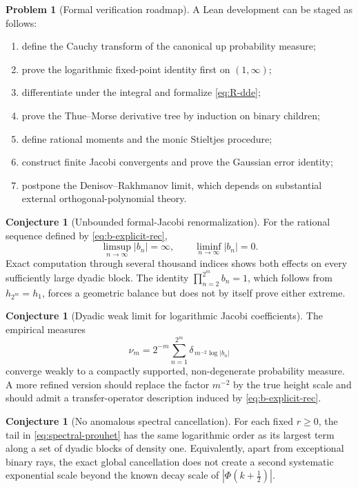 \documentclass[11pt]{article}
\theoremstyle{definition}
\newtheorem{conjecture}[theorem]{Conjecture}
\newtheorem{problem}[theorem]{Problem}
\theoremstyle{remark}
\begin{document}
\begin{problem}[Formal verification roadmap]
A Lean development can be staged as follows:
\begin{enumerate}
\item define the Cauchy transform of the canonical up probability measure;
\item prove the logarithmic fixed-point identity first on \((1,\infty)\);
\item differentiate under the integral and formalize \eqref{eq:R-dde};
\item prove the Thue--Morse derivative tree by induction on binary children;
\item define rational moments and the monic Stieltjes procedure;
\item construct finite Jacobi convergents and prove the Gaussian error identity;
\item postpone the Denisov--Rakhmanov limit, which depends on substantial external
      orthogonal-polynomial theory.
\end{enumerate}
\end{problem}



\begin{conjecture}[Unbounded formal-Jacobi renormalization]
\label{conj:formal-b-unbounded}
For the rational sequence defined by \eqref{eq:b-explicit-rec},
\[
 \limsup_{n\to\infty}|b_n|=\infty,
 \qquad
 \liminf_{n\to\infty}|b_n|=0.
\]
Exact computation through several thousand indices shows both effects on every sufficiently
large dyadic block.  The identity \(\prod_{n=2}^{2^m}b_n=1\), which follows from
\(h_{2^m}=h_1\), forces a geometric balance but does not by itself prove either extreme.
\end{conjecture}

\begin{conjecture}[Dyadic weak limit for logarithmic Jacobi coefficients]
\label{conj:b-log-limit}
The empirical measures
\[
 \nu_m=2^{-m}\sum_{n=1}^{2^m}
 \delta_{\,m^{-2}\log|b_n|}
\]
converge weakly to a compactly supported, non-degenerate probability measure.  A more
refined version should replace the factor \(m^{-2}\) by the true height scale and should
admit a transfer-operator description induced by \eqref{eq:b-explicit-rec}.
\end{conjecture}

\begin{conjecture}[No anomalous spectral cancellation]
\label{conj:no-anomalous-cancellation}
For each fixed \(r\ge0\), the tail in \eqref{eq:spectral-prouhet} has the same logarithmic
order as its largest term along a set of dyadic blocks of density one.  Equivalently, apart
from exceptional binary rays, the exact global cancellation does not create a second
systematic exponential scale beyond the known decay scale of
\(|\Phi(k+\tfrac12)|\).
\end{conjecture}
\end{document}
